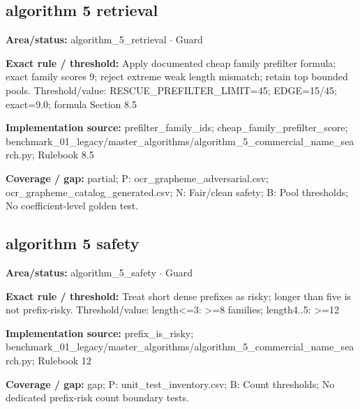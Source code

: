 \subsection*{algorithm 5 retrieval}
\begin{tcolorbox}[enhanced,breakable,colback=white,colframe=Muted!45,boxrule=0.45pt,arc=1.5pt,left=6pt,right=6pt,top=5pt,bottom=5pt,title={\texttt{A5-PREFILTER-06}},title after break={\texttt{A5-PREFILTER-06}\ (continued)},fonttitle=\headingfont\bfseries\color{Navy},coltitle=Navy]
\textbf{Area/status:} algorithm\_\allowbreak{}5\_\allowbreak{}retrieval $\boldsymbol{\cdot}$ Guard\par
\smallskip
\textbf{Exact rule / threshold:} Apply documented cheap family prefilter formula; exact family scores 9; reject extreme weak length mismatch; retain top bounded pools. Threshold/\allowbreak{}value: RESCUE\_\allowbreak{}PREFILTER\_\allowbreak{}LIMIT=45; EDGE=15/\allowbreak{}45; exact=9.0; formula Section 8.5\par
\smallskip
\textbf{Implementation source:} prefilter\_\allowbreak{}family\_\allowbreak{}ids; cheap\_\allowbreak{}family\_\allowbreak{}prefilter\_\allowbreak{}score; benchmark\_\allowbreak{}01\_\allowbreak{}legacy/\allowbreak{}master\_\allowbreak{}algorithms/\allowbreak{}algorithm\_\allowbreak{}5\_\allowbreak{}commercial\_\allowbreak{}name\_\allowbreak{}search.py; Rulebook 8.5\par
\smallskip
\textbf{Coverage / gap:} partial; P: ocr\_\allowbreak{}grapheme\_\allowbreak{}adversarial.csv; ocr\_\allowbreak{}grapheme\_\allowbreak{}catalog\_\allowbreak{}generated.csv; N: Fair/\allowbreak{}clean safety; B: Pool thresholds; No coefficient-level golden test.
\end{tcolorbox}
\medskip
\subsection*{algorithm 5 safety}
\begin{tcolorbox}[enhanced,breakable,colback=white,colframe=Muted!45,boxrule=0.45pt,arc=1.5pt,left=6pt,right=6pt,top=5pt,bottom=5pt,title={\texttt{A5-PREFIX-RISK-23}},title after break={\texttt{A5-PREFIX-RISK-23}\ (continued)},fonttitle=\headingfont\bfseries\color{Navy},coltitle=Navy]
\textbf{Area/status:} algorithm\_\allowbreak{}5\_\allowbreak{}safety $\boldsymbol{\cdot}$ Guard\par
\smallskip
\textbf{Exact rule / threshold:} Treat short dense prefixes as risky; longer than five is not prefix-risky. Threshold/\allowbreak{}value: length<=3: >=8 families; length4..5: >=12\par
\smallskip
\textbf{Implementation source:} prefix\_\allowbreak{}is\_\allowbreak{}risky; benchmark\_\allowbreak{}01\_\allowbreak{}legacy/\allowbreak{}master\_\allowbreak{}algorithms/\allowbreak{}algorithm\_\allowbreak{}5\_\allowbreak{}commercial\_\allowbreak{}name\_\allowbreak{}search.py; Rulebook 12\par
\smallskip
\textbf{Coverage / gap:} gap; P: unit\_\allowbreak{}test\_\allowbreak{}inventory.csv; B: Count thresholds; No dedicated prefix-risk count boundary tests.
\end{tcolorbox}
\medskip
